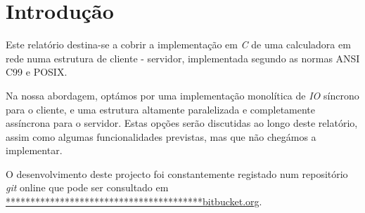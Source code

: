 \section{Introdução\label{sec:Introducao}}

	\indent\indent Este relatório destina-se a cobrir a implementação em \emph{C} de uma calculadora em rede numa estrutura de cliente - servidor, implementada segundo as normas ANSI C99 e POSIX.

	Na nossa abordagem, optámos por uma implementação monolítica de \emph{IO} síncrono para o cliente, e uma estrutura altamente paralelizada e completamente assíncrona para o servidor.
	Estas opções serão discutidas ao longo deste relatório, assim como algumas funcionalidades previstas, mas que não chegámos a implementar.

	O desenvolvimento deste projecto foi constantemente registado num repositório \emph{git} online que pode ser consultado em \href{http://www.google.com}{****************************************bitbucket.org}.

\clearpage